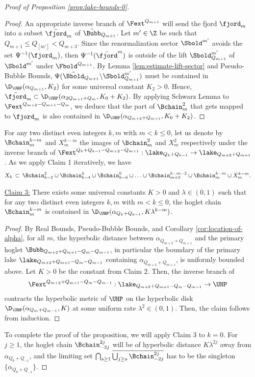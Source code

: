 \documentclass{amsart}
\begin{document}
\begin{proof}[Proof of Proposition \ref{prop:lake-bounds-0}]
\begin{proof}
        An appropriate inverse branch of $\Fext^{Q_{m+1}}$ will send the fjord $\fjord_m$ into a subset $\tilde{\fjord}_m$ of $\hat{\Bubb}_{Q_{m+1}}$. 
        Let $m' \in \Z$ be such that $Q_{m+1} \leq Q_{[m']} < Q_{m+3}$.
        Since the renormalization sector $\Sbold^{m'}$ avoids the set $\Psi^{-1} (\fjord_m)$, then
        $\Psi^{-1}(\tilde{\fjord}^m)$ is outside of the lift $\Sbold_{Q_{m+1}}^{m'}$ of $\Sbold^{m'}$ under $\Fbold^{Q_{m+1}}$.
        By Lemma \ref{lem:estimate-lift-sector} and Pseudo-Bubble Bounds, $\Psi(\hat{\Bbold}_{Q_{m+1}}\backslash \Sbold^{m'}_{Q_{m+1}})$ must be contained in $\D_{\UHP}(\alpha_{Q_{m+1}}, K_2)$ for some universal constant $K_2>0$. 
        Hence, $\tilde{\fjord}_m \subset \D_{\UHP}(\alpha_{2Q_{m+1}+Q_m}, K_0+ K_2)$.
        By applying Schwarz Lemma to $\Fext^{Q_{m+2}-Q_{m+1}-Q_m}$, we deduce that the part of $\Bchain_m^2$ that gets mapped to $\fjord_m$ is also contained in $\D_{\UHP}(\alpha_{Q_{m+2}+Q_{m+1}}, K_0 + K_2)$.
    \end{proof}

    For any two distinct even integers $k,m$ with $m<k\leq 0$, let us denote by $\Bchain_{m}^{k-m}$ and $X_{m}^{k-m}$ the images of $\Bchain_m^2$ and $X_{m}^{2}$ respectively under the inverse branch of $\Fext^{Q_k+Q_{k-1}-Q_{m+2}-Q_{m+1}}: \lake_{Q_k+Q_{k-1}} \to \lake_{Q_{m+2}+Q_{m+1}}$. As we apply Claim 1 iteratively, we have
    \[
        X_{k} \, \subset \, \Bchain_{k-2}^2 \cup \Bchain_{k-4}^4 \cup \Bchain_{k-6}^6 \cup \ldots \cup \Bchain_{m+2}^{k-m-2} \cup \Bchain_{m}^{k-m} \cup X_{m}^{k-m}.
    \]

    \noindent \underline{Claim 3:} There exists some universal constants $K>0$ and $\lambda \in (0,1)$ such that for any two distinct even integers $k,m$ with $m<k\leq 0$, the hoglet chain $\Bchain_m^{k-m}$ is contained in $\D_{\UHP}(\alpha_{Q_k+Q_{k-1}}, K \lambda^{k-m})$.

    \begin{proof}
        By Real Bounds, Pseudo-Bubble Bounds, and Corollary \ref{cor:location-of-alpha}, for all $m$, the hyperbolic distance between $\alpha_{Q_{m+2}+Q_{m+1}}$ and the primary hoglet $\Bubb_{Q_{m+2}+Q_{m+1}-Q_m-Q_{m-1}}$, in particular the boundary of the primary lake $\lake_{Q_{m+2}+Q_{m+1}-Q_m-Q_{m-1}}$ containing $\alpha_{Q_{m+2}+Q_{m+1}}$, is uniformly bounded above. 
        Let $K>0$ be the constant from Claim 2. Then, the inverse branch of 
        \[
        \Fext^{Q_{m+2}+Q_{m+1}-Q_m-Q_{m-1}}: \lake_{Q_{m+2}+Q_{m+1}-Q_m-Q_{m-1}} \to \UHP
        \]
        contracts the hyperbolic metric of $\UHP$ on the hyperbolic disk $\D_\UHP(\alpha_{Q_m+Q_{m-1}},K)$ at some uniform rate $\lambda^2 \in (0,1)$. Then, the claim follows from induction.
    \end{proof}

    To complete the proof of the proposition, we will apply Claim 3 to $k=0$. For $j \geq 1$, the hoglet chain $\Bchain_{-2j}^{2j}$ will be of hyperbolic distance $K \lambda^{2j}$ away from $\alpha_{Q_0+Q_{-1}}$, and the limiting set $\bigcap_{s \geq 1} \overline{\bigcup_{ j \geq s } \Bchain_{-2j}^{2j}}$ has to be the singleton $\{\alpha_{Q_0+Q_{-1}}\}$.
\end{proof}
\end{document}
